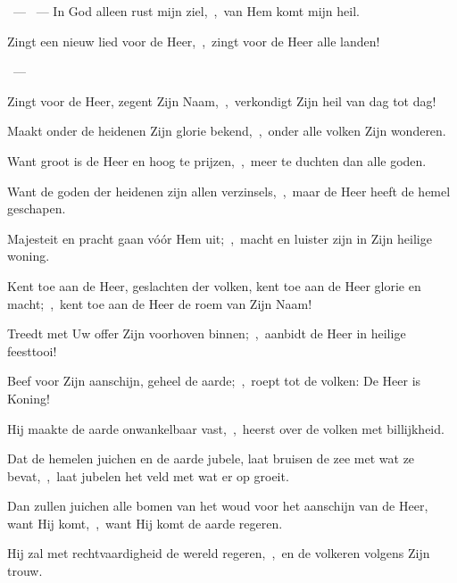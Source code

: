 \documentclass[12pt,twoside,a5paper]{article}
\begin{document}
\begin{halfparskip}
  ~--- ~---  In God alleen rust mijn ziel,~\sep\ van Hem komt mijn heil.
\end{halfparskip}

\begin{halfparskip}
   
\end{halfparskip}

\begin{halfparskip}
   Zingt een nieuw lied voor de Heer,~\sep\ zingt voor de Heer alle landen!

  ~--- 

  Zingt voor de Heer, zegent Zijn Naam,~\sep\ verkondigt Zijn heil van dag tot dag!

  Maakt onder de heidenen Zijn glorie bekend,~\sep\ onder alle volken Zijn wonderen.

  Want groot is de Heer en hoog te prijzen,~\sep\ meer te duchten dan alle goden.

  Want de goden der heidenen zijn allen verzinsels,~\sep\ maar de Heer heeft de hemel geschapen.

  Majesteit en pracht gaan vóór Hem uit;~\sep\ macht en luister zijn in Zijn heilige woning.

  Kent toe aan de Heer, geslachten der volken, kent toe aan de Heer glorie en macht;~\sep\ kent toe aan de Heer de roem van Zijn Naam!

  Treedt met Uw offer Zijn voorhoven binnen;~\sep\ aanbidt de Heer in heilige feesttooi!

  Beef voor Zijn aanschijn, geheel de aarde;~\sep\ roept tot de volken: De Heer is Koning!

  Hij maakte de aarde onwankelbaar vast,~\sep\ heerst over de volken met billijkheid.

  Dat de hemelen juichen en de aarde jubele, laat bruisen de zee met wat ze bevat,~\sep\ laat jubelen het veld met wat er op groeit.

  Dan zullen juichen alle bomen van het woud voor het aanschijn van de Heer, want Hij komt,~\sep\ want Hij komt de aarde regeren.

  Hij zal met rechtvaardigheid de wereld regeren,~\sep\ en de volkeren volgens Zijn trouw.
\end{halfparskip}
\end{document}
